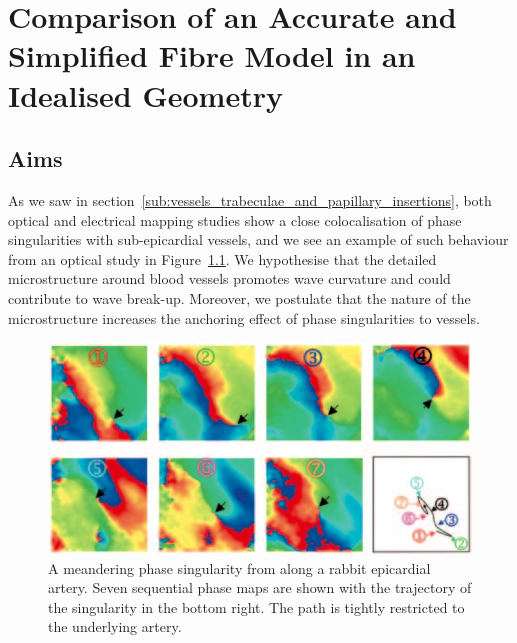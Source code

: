 \chapter{Comparison of an Accurate and Simplified Fibre Model in an Idealised Geometry}
\dblspace

\section{Aims}
\label{sec:cha5:aims}
  As we saw in section~\ref{sub:vessels_trabeculae_and_papillary_insertions}, both optical and electrical mapping studies show a close colocalisation of phase singularities with sub-epicardial vessels, and we see an example of such behaviour from an optical study in Figure~\ref{fig:meandering}. We hypothesise that the detailed microstructure around blood vessels promotes wave curvature and could contribute to wave break-up. Moreover, we postulate that the nature of the microstructure increases the anchoring effect of phase singularities to vessels.

  \begin{figure}[htbp]
		\centering
		\includegraphics[width=1\textwidth]{Ch4/Figs/valderrabano}
    \caption{A meandering phase singularity from \cite{Valderrabano2003} along a rabbit epicardial artery. Seven sequential phase maps are shown with the trajectory of the  singularity in the bottom right. The path is tightly restricted to the underlying artery.}
		\label{fig:meandering}
	\end{figure}

